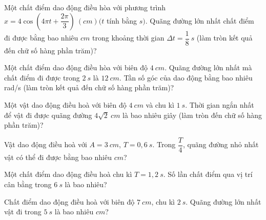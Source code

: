 \setcounter{ex}{0}
\PhanIII
\begin{ex}
Một chất điểm dao động điều hòa với phương trình $x=4 \cos \left(4 \pi t+\dfrac{2 \pi}{3}\right)\ (cm)(t$ tính bằng $s)$. Quãng đường lớn nhất chất điểm đi được bằng bao nhiêu $cm$ trong khoảng thời gian $\Delta t=\dfrac{1}{8} \ s$ (làm tròn kết quả đến chữ số hàng phần trăm)?
\end{ex} 
\begin{ex}
Một chất điểm dao động điều hòa với biên độ $4 \ cm$. Quãng đường lớn nhất mà chất điểm đi được trong $2 \ s$ là $12 \ cm$. Tần số góc của dao động bằng bao nhiêu rad/s (làm tròn kết quả đến chữ số hàng phần trăm)?
\end{ex} 

\begin{ex}
Một vật dao động điều hoà với biên độ $4\ cm$ và chu kì $1\ s$. Thời gian ngắn nhất để vật đi được quãng đường $4\sqrt{2}\ cm$ là bao nhiêu giây (làm tròn đến chữ số hàng phần trăm)?
\end{ex}


\begin{ex}
Vật dao động điều hoà với $A = 3\ cm$, $T = 0,6\ s$. Trong $\dfrac{T}{4}$, quãng đường nhỏ nhất vật có thể đi được bằng bao nhiêu $cm$?
\end{ex}

\begin{ex}
Một chất điểm dao động điều hoà chu kì $T = 1,2\ s$. Số lần chất điểm qua vị trí cân bằng trong $6\ s$ là bao nhiêu?
\end{ex}

\begin{ex}
Chất điểm dao động điều hoà với biên độ $7\ cm$, chu kì $2\ s$. Quãng đường lớn nhất vật đi trong $5\ s$ là bao nhiêu $cm$?
\end{ex}




